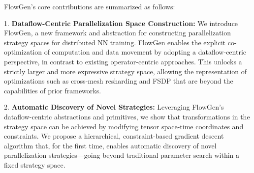 
FlowGen's core contributions are summarized as follows:

1. \textbf{Dataflow-Centric Parallelization Space Construction:} We introduce FlowGen, a new framework and abstraction for constructing parallelization strategy spaces for distributed NN training. FlowGen enables the explicit co-optimization of computation and data movement by adopting a dataflow-centric perspective, in contrast to existing operator-centric approaches. This unlocks a strictly larger and more expressive strategy space, allowing the representation of optimizations such as cross-mesh resharding and FSDP that are beyond the capabilities of prior frameworks.

2. \textbf{Automatic Discovery of Novel Strategies:} Leveraging FlowGen's dataflow-centric abstractions and primitives, we show that transformations in the strategy space can be achieved by modifying tensor space-time coordinates and constraints. We propose a hierarchical, constraint-based gradient descent algorithm that, for the first time, enables automatic discovery of novel parallelization strategies—going beyond traditional parameter search within a fixed strategy space.

